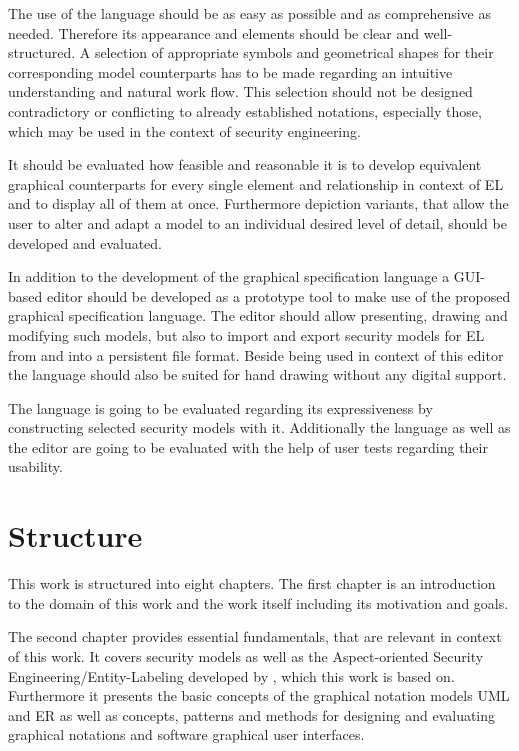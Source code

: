 \documentclass[twoside, openright, 12pt]{book}
\begin{document}
The use of the language should be as easy as possible and as comprehensive as needed.
Therefore its appearance and elements should be clear and well-structured.
A selection of appropriate symbols and geometrical shapes for their corresponding model counterparts has to be made regarding an intuitive understanding and natural work flow.
This selection should not be designed contradictory or conflicting to already established notations, especially those, which may be used in the context of security engineering.

It should be evaluated how feasible and reasonable it is to develop equivalent graphical counterparts for every single element and relationship in context of EL and to display all of them at once.
Furthermore depiction variants, that allow the user to alter and adapt a model to an individual desired level of detail, should be developed and evaluated.

In addition to the development of the graphical specification language a GUI-based editor should be developed as a prototype tool to make use of the proposed graphical specification language.
The editor should allow presenting, drawing and modifying such models, but also to import and export security models for EL from and into a persistent file format.
Beside being used in context of this editor the language should also be suited for hand drawing without any digital support.

The language is going to be evaluated regarding its expressiveness by constructing selected security models with it.
Additionally the language as well as the editor are going to be evaluated with the help of user tests regarding their usability.



\section{Structure}
\label{structure}
This work is structured into eight chapters.
The first chapter is an introduction to the domain of this work and the work itself including its motivation and goals.

The second chapter provides essential fundamentals, that are relevant in context of this work.
It covers security models as well as the Aspect-oriented Security Engineering/Entity-Labeling developed by \cite{Amthor18}, which this work is based on.
Furthermore it presents the basic concepts of the graphical notation models UML and ER as well as concepts, patterns and methods for designing and evaluating graphical notations and software graphical user interfaces.
\end{document}
